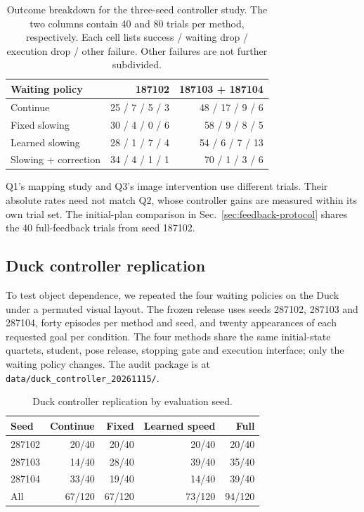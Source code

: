 \begin{table}[h]
\centering\small
\setlength{\tabcolsep}{3pt}
\begin{tabular}{lrr}
\toprule
Waiting policy & 187102 & 187103 + 187104\\
\midrule
Continue & 25 / 7 / 5 / 3 & 48 / 17 / 9 / 6\\
Fixed slowing & 30 / 4 / 0 / 6 & 58 / 9 / 8 / 5\\
Learned slowing & 28 / 1 / 7 / 4 & 54 / 6 / 7 / 13\\
Slowing + correction & 34 / 4 / 1 / 1 & 70 / 1 / 3 / 6\\
\bottomrule
\end{tabular}
\caption{Outcome breakdown for the three-seed controller study. The two columns contain 40 and 80 trials per method, respectively. Each cell lists success / waiting drop / execution drop / other failure. Other failures are not further subdivided.}
\label{tab:collaborator-waiting}
\end{table}

Q1's mapping study and Q3's image intervention use different trials. Their absolute rates need not match Q2, whose controller gains are measured within its own trial set. The initial-plan comparison in Sec.~\ref{sec:feedback-protocol} shares the 40 full-feedback trials from seed 187102.

\subsection{Duck controller replication}
To test object dependence, we repeated the four waiting policies on the Duck under a permuted visual layout. The frozen release uses seeds 287102, 287103 and 287104, forty episodes per method and seed, and twenty appearances of each requested goal per condition. The four methods share the same initial-state quartets, student, pose release, stopping gate and execution interface; only the waiting policy changes. The audit package is at \texttt{data/duck\_controller\_20261115/}.

\begin{table}[h]
\centering\small
\setlength{\tabcolsep}{3pt}
\begin{tabular}{lrrrr}
\toprule
Seed & Continue & Fixed & Learned speed & Full\\
\midrule
287102 & 20/40 & 20/40 & 20/40 & 20/40\\
287103 & 14/40 & 28/40 & 39/40 & 35/40\\
287104 & 33/40 & 19/40 & 14/40 & 39/40\\
\midrule
All & 67/120 & 67/120 & 73/120 & 94/120\\
\bottomrule
\end{tabular}
\caption{Duck controller replication by evaluation seed.}
\label{tab:duck-controller-seeds}
\end{table}

